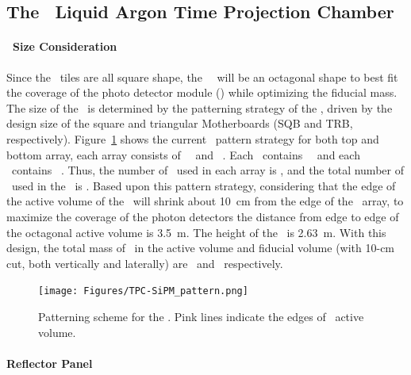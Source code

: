 \subsection{The \DSk\ Liquid Argon Time Projection Chamber}
\label{sec:TPC}


\paragraph{\LArTPC\ Size Consideration}

Since the \SiPM\ tiles are all square shape, the \DSk\ \TPC\ will be an octagonal shape to best fit the coverage of the photo detector module (\DSkPdm) while optimizing the fiducial mass. 
The size of the \TPC\ is determined by the patterning strategy of the \SiPMs, driven by the design size of the square and triangular Motherboards (SQB and TRB, respectively).  Figure~\ref{fig:TPC-SiPM_pattern} shows the current \SiPM\ pattern strategy for both top and bottom array, each array consists of \DSkArraySQBNumber\ \SQBs\ and \DSkArrayTRBNumber\ \TRBs. Each \TRB\ contains \DSkTRBPdmsNumber\ \DSkPdms\ and each \SQB\ contains \DSkSQBPdmsNumber\ \DSkPdms.  Thus, the number of \DSkPdms\ used in each array is \DSkTilesHalfNumber, and the total number of \DSkPdms\ used in the \TPC\ is \DSkTilesNumber.  Based upon this pattern strategy, considering that the edge of the active volume of the \TPC\ will shrink about \SI{10}{\centi\meter} from the edge of the \SiPM\ array, to maximize the coverage of the photon detectors the distance from edge to edge of the octagonal active volume is \SI{3.5}{\meter}.  The height of the \TPC\ is \SI{2.63}{\meter}. With this design, the total mass of \LAr\ in the active volume and fiducial volume (with 10-cm cut, both vertically and laterally) are \DSkActiveMass\ and \DSkFiducialMass\, respectively. 
\begin{figure}[h!]
\centering
\texttt{[image: Figures/TPC-SiPM\_pattern.png]}
\caption{Patterning scheme for the \DSkPdms. Pink lines indicate the edges of \TPC\ active volume.}
\label{fig:TPC-SiPM_pattern}
\end{figure} 

\paragraph{Reflector Panel}

